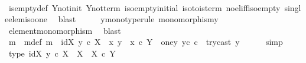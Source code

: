 \begin{isabellebody}
\ \ \ \ \isamarkupfalse%
\ is{\isacharunderscore}{\kern0pt}empty{\isacharunderscore}{\kern0pt}def\ Y{\isacharunderscore}{\kern0pt}not{\isacharunderscore}{\kern0pt}init\ Y{\isacharunderscore}{\kern0pt}not{\isacharunderscore}{\kern0pt}term\ iso{\isacharunderscore}{\kern0pt}empty{\isacharunderscore}{\kern0pt}initial\ iso{\isacharunderscore}{\kern0pt}to{}{\isacharunderscore}{\kern0pt}is{\isacharunderscore}{\kern0pt}term\ no{\isacharunderscore}{\kern0pt}el{\isacharunderscore}{\kern0pt}iff{\isacharunderscore}{\kern0pt}iso{\isacharunderscore}{\kern0pt}empty\ single{\isacharunderscore}{\kern0pt}elem{\isacharunderscore}{\kern0pt}iso{\isacharunderscore}{\kern0pt}one\ \isamarkupfalse%
\ blast\isanewline
\ \ \isamarkupfalse%
\ \isamarkupfalse%
\ y{}{\isacharunderscore}{\kern0pt}mono{\isacharbrackleft}{\kern0pt}type{\isacharunderscore}{\kern0pt}rule{\isacharbrackright}{\kern0pt}{\isacharcolon}{\kern0pt}\ {\isachardoublequoteopen}monomorphism{\isacharparenleft}{\kern0pt}y{}{\isacharparenright}{\kern0pt}{\isachardoublequoteclose}\isanewline
\ \ \ \ \isamarkupfalse%
\ element{\isacharunderscore}{\kern0pt}monomorphism\ \isamarkupfalse%
\ blast\isanewline
\ \ \isamarkupfalse%
\ m\ \ m{\isacharunderscore}{\kern0pt}def{\isacharcolon}{\kern0pt}\ {\isachardoublequoteopen}m\ {\isacharequal}{\kern0pt}\ {\isasymlangle}id{\isacharparenleft}{\kern0pt}X{\isacharparenright}{\kern0pt}{\isacharcomma}{\kern0pt}\ y{}\ {\isasymcirc}\isactrlsub c\ {\isasymbeta}\isactrlbsub X\isactrlesub {\isasymrangle}\ {\isasymamalg}\ {\isacharparenleft}{\kern0pt}{\isacharparenleft}{\kern0pt}{\isasymlangle}x{}{\isacharcomma}{\kern0pt}\ y{}{\isasymrangle}\ {\isasymamalg}\ {\isasymlangle}x{}\ {\isasymcirc}\isactrlsub c\ {\isasymbeta}\isactrlbsub Y\ {\isasymsetminus}\ {\isacharparenleft}{\kern0pt}one{\isacharcomma}{\kern0pt}y{}{\isacharparenright}{\kern0pt}\isactrlesub {\isacharcomma}{\kern0pt}\ y{}\isactrlsup c{\isasymrangle}{\isacharparenright}{\kern0pt}\ {\isasymcirc}\isactrlsub c\ \ try{\isacharunderscore}{\kern0pt}cast\ y{}{\isacharparenright}{\kern0pt}{\isachardoublequoteclose}\isanewline
\ \ \ \ \isamarkupfalse%
\ simp\isanewline
\ \ \isamarkupfalse%
\ type{}{\isacharcolon}{\kern0pt}\ {\isachardoublequoteopen}{\isasymlangle}id{\isacharparenleft}{\kern0pt}X{\isacharparenright}{\kern0pt}{\isacharcomma}{\kern0pt}\ y{}\ {\isasymcirc}\isactrlsub c\ {\isasymbeta}\isactrlbsub X\isactrlesub {\isasymrangle}\ {\isacharcolon}{\kern0pt}\ X\ {\isasymrightarrow}\ {\isacharparenleft}{\kern0pt}X\ {\isasymtimes}\isactrlsub c\ Y{\isacharparenright}{\kern0pt}{\isachardoublequoteclose}\isanewline

\end{isabellebody}

